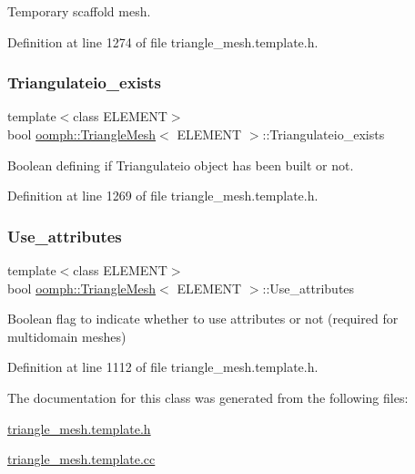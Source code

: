 Temporary scaffold mesh. 



Definition at line 1274 of file triangle\+\_\+mesh.\+template.\+h.

\mbox{\label{classoomph_1_1TriangleMesh_a6675edf7227a8ae62d7c13c8b406842b}} 
\subsubsection{\texorpdfstring{Triangulateio\+\_\+exists}{Triangulateio\_exists}}
{\footnotesize\ttfamily template$<$class E\+L\+E\+M\+E\+NT$>$ \\
bool \hyperlink{classoomph_1_1TriangleMesh}{oomph\+::\+Triangle\+Mesh}$<$ E\+L\+E\+M\+E\+NT $>$\+::Triangulateio\+\_\+exists\hspace{0.3cm}{\ttfamily [protected]}}



Boolean defining if Triangulateio object has been built or not. 



Definition at line 1269 of file triangle\+\_\+mesh.\+template.\+h.

\mbox{\label{classoomph_1_1TriangleMesh_a166a8057de8390280acb6365c3df87d0}} 
\subsubsection{\texorpdfstring{Use\+\_\+attributes}{Use\_attributes}}
{\footnotesize\ttfamily template$<$class E\+L\+E\+M\+E\+NT$>$ \\
bool \hyperlink{classoomph_1_1TriangleMesh}{oomph\+::\+Triangle\+Mesh}$<$ E\+L\+E\+M\+E\+NT $>$\+::Use\+\_\+attributes}

Boolean flag to indicate whether to use attributes or not (required for multidomain meshes) 

Definition at line 1112 of file triangle\+\_\+mesh.\+template.\+h.



The documentation for this class was generated from the following files\+:\begin{DoxyCompactItemize}
\item 
\hyperlink{triangle__mesh_8template_8h}{triangle\+\_\+mesh.\+template.\+h}\item 
\hyperlink{triangle__mesh_8template_8cc}{triangle\+\_\+mesh.\+template.\+cc}\end{DoxyCompactItemize}
